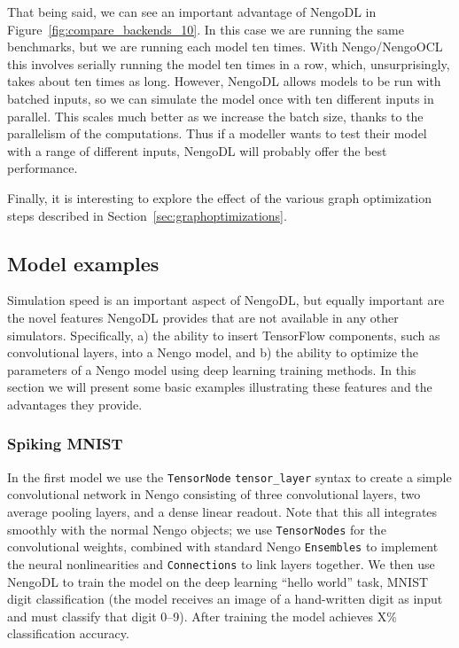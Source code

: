 \documentclass{article}
\begin{document}
That being said, we can see an important advantage of NengoDL in Figure~\ref{fig:compare_backends_10}.  In this case we are running the same benchmarks, but we are running each model ten times.  With Nengo/NengoOCL this involves serially running the model ten times in a row, which, unsurprisingly, takes about ten times as long.  However, NengoDL allows models to be run with batched inputs, so we can simulate the model once with ten different inputs in parallel.  This scales much better as we increase the batch size, thanks to the parallelism of the computations.  Thus if a modeller wants to test their model with a range of different inputs, NengoDL will probably offer the best performance.


Finally, it is interesting to explore the effect of the various graph optimization steps described in Section~\ref{sec:graphoptimizations}.

\subsection{Model examples}

Simulation speed is an important aspect of NengoDL, but equally important are the novel features NengoDL provides that are not available in any other simulators.  Specifically, a) the ability to insert TensorFlow components, such as convolutional layers, into a Nengo model, and b) the ability to optimize the parameters of a Nengo model using deep learning training methods.  In this section we will present some basic examples illustrating these features and the advantages they provide.

\subsubsection{Spiking MNIST}
\label{sec:spiking_mnist}

In the first model we use the \texttt{TensorNode}  \texttt{tensor\_layer} syntax to create a simple convolutional network in Nengo consisting of three convolutional layers, two average pooling layers, and a dense linear readout.  Note that this all integrates smoothly with the normal Nengo objects; we use \texttt{TensorNodes} for the convolutional weights, combined with standard Nengo \texttt{Ensembles} to implement the neural nonlinearities and \texttt{Connections} to link layers together.  We then use NengoDL to train the model on the deep learning ``hello world'' task, MNIST digit classification (the model receives an image of a hand-written digit as input and must classify that digit 0--9).  After training the model achieves X\% classification accuracy.
\end{document}

